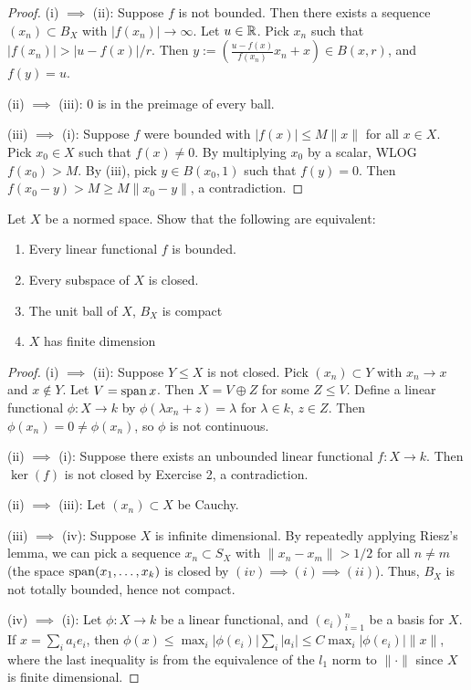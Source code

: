 \documentclass{article}
\begin{document}

\begin{proof}
(i) $\implies$ (ii): Suppose $f$ is not bounded. Then there exists a sequence $(x_n) \subset B_X$ with $|f(x_n)| \to \infty$.  Let $u \in \mathbb{R}$.  Pick $x_n$ such that $|f(x_n)| > |u - f(x)|/r$.  Then $y := (\frac{u - f(x)}{f(x_n)} x_n + x) \in B(x,r)$, and $f(y) = u$.

(ii) $\implies$ (iii):  $0$ is in the preimage of every ball.

(iii) $\implies$ (i): Suppose $f$ were bounded with $|f(x)| \le M \|x\|$ for all $x \in X$.  Pick $x_0 \in X$ such that $f(x) \neq 0$. By multiplying $x_0$ by a scalar, WLOG $f(x_0) > M$.  By (iii), pick $y \in B(x_0, 1)$ such that $f(y) = 0$.  Then $f(x_0 - y) > M \ge M \|x_0 - y\|$, a contradiction.
\end{proof}


 Let $X$ be a normed space. Show that the following are equivalent:
\begin{enumerate}
\item Every linear functional $f$ is bounded.
\item Every subspace of $X$ is closed.
\item The unit ball of $X$, $B_X$ is compact
\item $X$ has finite dimension
\end{enumerate}

\begin{proof}
(i) $\implies$ (ii):  Suppose $Y \le X$ is not closed. Pick $(x_n) \subset Y$ with $x_n \to x$ and $x \not\in Y$. Let $V = \operatorname{span}{x}$. Then $X = V \oplus Z$ for some $Z \le V$.  Define a linear functional $\phi: X \to k$ by $\phi(\lambda x_n + z) = \lambda$ for $\lambda \in k$, $z \in Z$.   Then $\phi(x_n) = 0 \neq \phi(x_n)$, so $\phi$ is not continuous.

(ii) $\implies$ (i): Suppose there exists an unbounded linear functional $f: X \to k$. Then $\ker(f)$ is not closed by Exercise 2, a contradiction.

(ii) $\implies$ (iii): Let $(x_n) \subset X$ be Cauchy.  %

(iii) $\implies$ (iv):  Suppose $X$ is infinite dimensional. By repeatedly applying Riesz's lemma, we can pick a sequence $x_n \subset S_X$ with $\|x_n - x_m\| > 1/2$ for all $n \neq m$  (the space $\operatorname{span}(x_1, \ldots, x_k)$ is closed by $(iv) \implies (i) \implies (ii)$). Thus, $B_X$ is not totally bounded, hence not compact.

(iv) $\implies$ (i): Let $\phi: X \to k$ be a linear functional, and $(e_i)_{i=1}^n$ be a basis for $X$.  If $x = \sum_i a_i e_i$, then $\phi(x) \le \max_i |\phi(e_i)| \sum_i |a_i| \le C \max_i |\phi(e_i)|  \|x\|$, where the last inequality is from the equivalence of the $l_1$ norm to $\| \cdot \|$ since $X$ is finite dimensional.
\end{proof}
\end{document}
